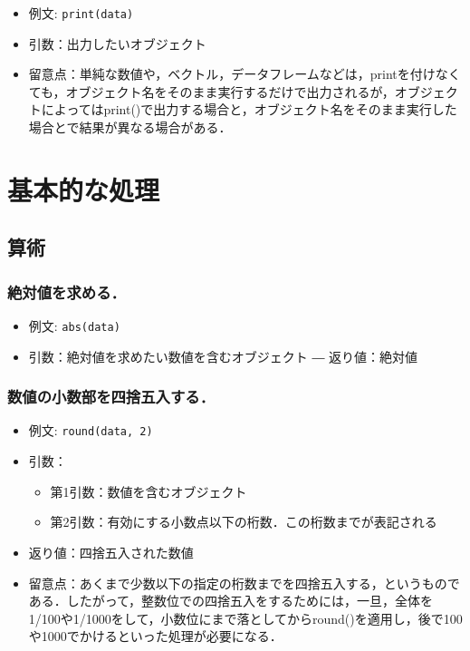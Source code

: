 \documentclass[
  xelatex, ja=standard]{bxjsarticle}
\providecommand{\tightlist}{%
  \setlength{\itemsep}{0pt}\setlength{\parskip}{0pt}}
\begin{document}
\begin{itemize}
\tightlist
\item
  例文: \texttt{print(data)}
\item
  引数：出力したいオブジェクト
\item
  留意点：単純な数値や，ベクトル，データフレームなどは，printを付けなくても，オブジェクト名をそのまま実行するだけで出力されるが，オブジェクトによってはprint()で出力する場合と，オブジェクト名をそのまま実行した場合とで結果が異なる場合がある．
\end{itemize}

\section{基本的な処理}\label{ux57faux672cux7684ux306aux51e6ux7406}

\subsection{算術}\label{ux7b97ux8853}

\subsubsection{絶対値を求める．}\label{ux7d76ux5bfeux5024ux3092ux6c42ux3081ux308b}

\begin{itemize}
\tightlist
\item
  例文: \texttt{abs(data)}
\item
  引数：絶対値を求めたい数値を含むオブジェクト ― 返り値：絶対値
\end{itemize}

\subsubsection{数値の小数部を四捨五入する．}\label{ux6570ux5024ux306eux5c0fux6570ux90e8ux3092ux56dbux6368ux4e94ux5165ux3059ux308b}

\begin{itemize}
\tightlist
\item
  例文: \texttt{round(data,\ 2)}
\item
  引数：

  \begin{itemize}
  \tightlist
  \item
    第1引数：数値を含むオブジェクト
  \item
    第2引数：有効にする小数点以下の桁数．この桁数までが表記される
  \end{itemize}
\item
  返り値：四捨五入された数値
\item
  留意点：あくまで少数以下の指定の桁数までを四捨五入する，というものである．したがって，整数位での四捨五入をするためには，一旦，全体を1/100や1/1000をして，小数位にまで落としてからround()を適用し，後で100や1000でかけるといった処理が必要になる．
\end{itemize}
\end{document}
